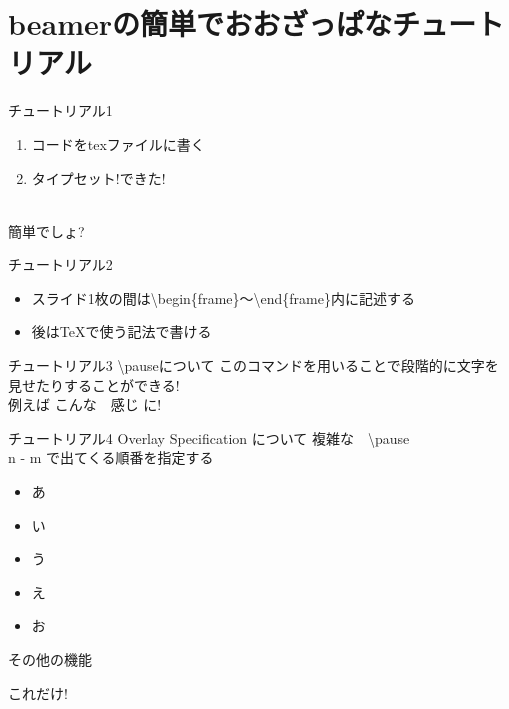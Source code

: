 \documentclass[dvipdfmx]{beamer}
\begin{document}
\section{beamerの簡単でおおざっぱなチュートリアル}
		\begin{frame}{チュートリアル1}
			\begin{enumerate}
				\item コードをtexファイルに書く\\ \pause
				\item {\huge タイプセット!できた!}	
			\end{enumerate}　\pause \\
		簡単でしょ?
		\end{frame}
		\begin{frame}{チュートリアル2}
			\begin{itemize}
				\item スライド1枚の間は\textbackslash begin\{frame\}～\textbackslash end\{frame\}内に記述する
				\item 後はTeXで使う記法で書ける
			\end{itemize}
		\end{frame}

		\begin{frame}{チュートリアル3 \textbackslash pauseについて}
			このコマンドを用いることで段階的に文字を見せたりすることができる!\\
			例えば \pause こんな　\pause 感じ \pause に!
		\end{frame}
		\begin{frame}{チュートリアル4 Overlay Specification について}
			複雑な　\textbackslash pause \\
			\textlangle n - m \textrangle で出てくる順番を指定する\\
			\begin{itemize}
			\item<2->あ
			\item<3->い
			\item<2->う
			\item<4->え
			\item<3->お
			\end{itemize}
		\end{frame}
		\begin{frame}{その他の機能}
		\end{frame}
\begin{frame}
	\huge これだけ!
\end{frame}
\end{document}

